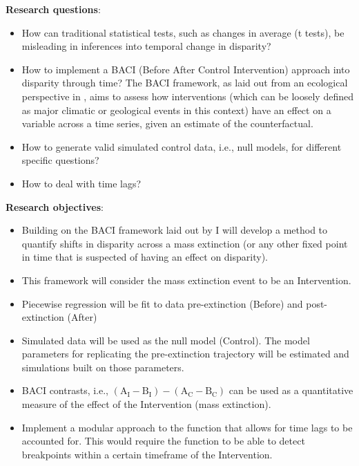 \documentclass[titlepage]{article}
\begin{document}
\noindent\textbf{Research questions}:
\begin{itemize}
    \item How can traditional statistical tests, such as changes in average (t tests), be misleading in inferences into temporal change in disparity?
    \item How to implement a BACI (Before After Control Intervention) approach into disparity through time? The BACI framework, as laid out from an ecological perspective in \cite{wauchope2021evaluating}, aims to assess how interventions (which can be loosely defined as major climatic or geological events in this context) have an effect on a variable across a time series, given an estimate of the counterfactual. 
    \item How to generate valid simulated control data, i.e., null models, for different specific questions? %
    \item How to deal with time lags?
\end{itemize}


\noindent\textbf{Research objectives}: 
\begin{itemize}
    \item Building on the BACI framework laid out by \cite{wauchope2021evaluating} I will develop a method to quantify shifts in disparity across a mass extinction (or any other fixed point in time that is suspected of having an effect on disparity).
    \item This framework will consider the mass extinction event to be an Intervention.
    \item Piecewise regression will be fit to data pre-extinction (Before) and post-extinction (After) 
    \item Simulated data will be used as the null model (Control). The model parameters for replicating the pre-extinction trajectory will be estimated and simulations built on those parameters.
    \item BACI contrasts, i.e., $(\mathrm{A_{I}} - \mathrm{B_{I}}) - (\mathrm{A_{C}} - \mathrm{B_{C}})$ can be used as a quantitative measure of the effect of the Intervention (mass extinction).
    \item Implement a modular approach to the function that allows for time lags to be accounted for. This would require the function to be able to detect breakpoints within a certain timeframe of the Intervention.
\end{itemize}
\end{document}
